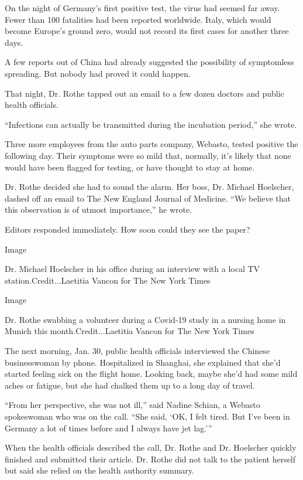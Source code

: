 On the night of Germany's first positive test, the virus had seemed far
away. Fewer than 100 fatalities had been reported worldwide. Italy,
which would become Europe's ground zero, would not record its first
cases for another three days.

A few reports out of China had already suggested the possibility of
symptomless spreading. But nobody had proved it could happen.

That night, Dr. Rothe tapped out an email to a few dozen doctors and
public health officials.

``Infections can actually be transmitted during the incubation period,''
she wrote.

Three more employees from the auto parts company, Webasto, tested
positive the following day. Their symptoms were so mild that, normally,
it's likely that none would have been flagged for testing, or have
thought to stay at home.

Dr. Rothe decided she had to sound the alarm. Her boss, Dr. Michael
Hoelscher, dashed off an email to The New England Journal of Medicine.
``We believe that this observation is of utmost importance,'' he wrote.

Editors responded immediately. How soon could they see the paper?

Image

Dr. Michael Hoelscher in his office during an interview with a local TV
station.Credit...Laetitia Vancon for The New York Times

Image

Dr. Rothe swabbing a volunteer during a Covid-19 study in a nursing home
in Munich this month.Credit...Laetitia Vancon for The New York Times

The next morning, Jan. 30, public health officials interviewed the
Chinese businesswoman by phone. Hospitalized in Shanghai, she explained
that she'd started feeling sick on the flight home. Looking back, maybe
she'd had some mild aches or fatigue, but she had chalked them up to a
long day of travel.

``From her perspective, she was not ill,'' said Nadine Schian, a Webasto
spokeswoman who was on the call. ``She said, `OK, I felt tired. But I've
been in Germany a lot of times before and I always have jet lag.'''

When the health officials described the call, Dr. Rothe and Dr.
Hoelscher quickly finished and submitted their article. Dr. Rothe did
not talk to the patient herself but said she relied on the health
authority summary.

